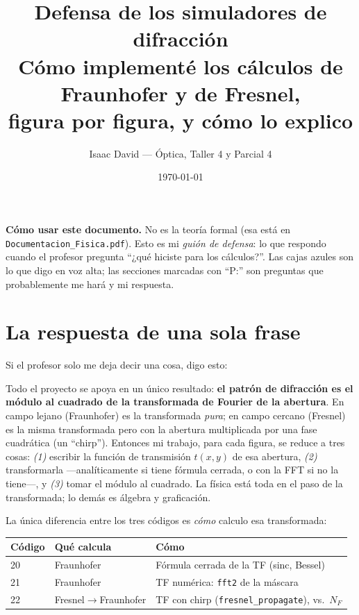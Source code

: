 \documentclass[11pt,a4paper]{article}
\title{\textbf{Defensa de los simuladores de difracción}\\[4pt]
\large Cómo implementé los cálculos de Fraunhofer y de Fresnel,\\
figura por figura, y cómo lo explico}
\author{Isaac David --- Óptica, Taller 4 y Parcial 4}
\date{\today}
\begin{document}
\maketitle

\begin{decir}
\textbf{Cómo usar este documento.} No es la teoría formal (esa está en
\texttt{Documentacion\_Fisica.pdf}). Esto es mi \emph{guión de defensa}: lo que
respondo cuando el profesor pregunta ``¿qué hiciste para los cálculos?''. Las
cajas azules son lo que digo en voz alta; las secciones marcadas con
``\textcolor{rojo}{P:}'' son preguntas que probablemente me hará y mi respuesta.
\end{decir}

\tableofcontents
\bigskip

\section{La respuesta de una sola frase}

Si el profesor solo me deja decir una cosa, digo esto:

\begin{decir}
Todo el proyecto se apoya en un único resultado: \textbf{el patrón de difracción
es el módulo al cuadrado de la transformada de Fourier de la abertura}. En campo
lejano (Fraunhofer) es la transformada \emph{pura}; en campo cercano (Fresnel) es
la misma transformada pero con la abertura multiplicada por una fase cuadrática
(un ``chirp''). Entonces mi trabajo, para cada figura, se reduce a tres cosas:
\emph{(1)} escribir la función de transmisión $t(x,y)$ de esa abertura,
\emph{(2)} transformarla ---analíticamente si tiene fórmula cerrada, o con la FFT
si no la tiene---, y \emph{(3)} tomar el módulo al cuadrado. La física está toda
en el paso de la transformada; lo demás es álgebra y graficación.
\end{decir}

La única diferencia entre los tres códigos es \emph{cómo} calculo esa transformada:

\begin{center}
\begin{tabular}{@{}lll@{}}
\toprule
\textbf{Código} & \textbf{Qué calcula} & \textbf{Cómo} \\
\midrule
20 & Fraunhofer & Fórmula cerrada de la TF (sinc, Bessel) \\
21 & Fraunhofer & TF numérica: \texttt{fft2} de la máscara \\
22 & Fresnel$\to$Fraunhofer & TF con chirp (\texttt{fresnel\_propagate}), vs.\ $N_F$ \\
\bottomrule
\end{tabular}
\end{center}
\end{document}
